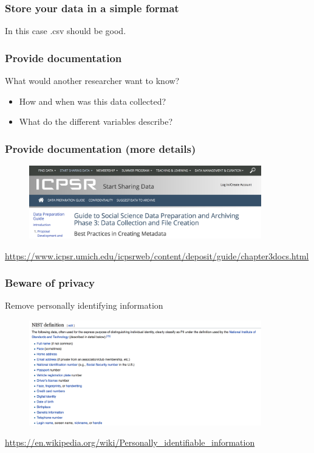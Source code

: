 \documentclass[aspectratio=169]{beamer}
\begin{document}
\begin{frame}
\frametitle{Store your data in a simple format}

\pause
In this case .csv should be good.

\end{frame}
\begin{frame}
\frametitle{Provide documentation}

\pause
What would another researcher want to know? 

\begin{itemize}
\item How and when was this data collected?
\item What do the different variables describe?
\end{itemize}

\end{frame}
\begin{frame}
\frametitle{Provide documentation (more details)}

\begin{figure}
  \centering
  \includegraphics[width=0.9\textwidth]{figures/icpsr_metadata}
\end{figure}

\vfill
\url{https://www.icpsr.umich.edu/icpsrweb/content/deposit/guide/chapter3docs.html}

\end{frame}
\begin{frame}
\frametitle{Beware of privacy}
\pause

Remove personally identifying information 

\begin{figure}
  \centering
  \includegraphics[width=0.9\textwidth]{figures/pii_nist}
\end{figure}

\vfill
\url{https://en.wikipedia.org/wiki/Personally_identifiable_information}

\end{frame}
\end{document}
